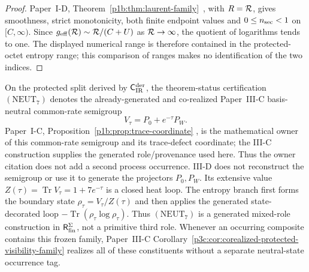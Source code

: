 \documentclass[12pt,a4paper]{article}
\begin{document}
\begin{proof}
Paper~I-D, Theorem~\ref{p1b:thm:laurent-family}~\cite{Kugelmann2026Paper1D},
with \(R=\mathcal R\), gives smoothness, strict monotonicity, both finite
endpoint values and \(0\le n_{\rm sec}<1\) on \([C,\infty)\).
Since \(g_{\mathrm{eff}}(\mathcal R)\sim\mathcal R/(C+U)\) as \(\mathcal R\to\infty\),
the quotient of logarithms tends to one.  The displayed numerical range
is therefore contained in the protected-octet entropy range; this
comparison of ranges makes no identification of the two indices.
\end{proof}

\begin{definition}
\label{p3:def:neutral-visibility-readout}
On the protected split derived by
\(\mathsf C_{\rm IR}^{\rm der}\), the theorem-status certification
\((\mathrm{NEUT}_7)\) denotes the already-generated and co-realized Paper~III-C
basis-neutral common-rate semigroup
\[
 V_\tau=P_0+e^{-\tau}P_W.
\]
Paper~I-C, Proposition~\ref{p1b:prop:trace-coordinate}
\cite{Kugelmann2026Paper1C}, is the mathematical owner of this common-rate
semigroup and its trace-defect coordinate; the III-C construction supplies
the generated role/provenance used here.  Thus the owner citation does not
add a second process occurrence.  III-D does not
reconstruct the semigroup or use it to generate the projectors \(P_0,P_W\).
Its extensive value
\(Z(\tau)=\operatorname{Tr}V_\tau=1+7e^{-\tau}\) is a closed heat loop.
The entropy branch first forms the boundary state
\(\rho_\tau=V_\tau/Z(\tau)\) and then applies the generated state-decorated
loop \(-\operatorname{Tr}(\rho_\tau\log\rho_\tau)\).  Thus
\((\mathrm{NEUT}_7)\) is a generated mixed-role construction in \(\mathsf R_{\mathrm{fin}}^{\Sigma}\),
not a primitive third role.  Whenever an occurring composite contains this
frozen family, Paper~III-C
Corollary~\ref{p3c:cor:corealized-protected-visibility-family} realizes all
of these constituents without a separate neutral-state occurrence tag.
\end{definition}
\end{document}
